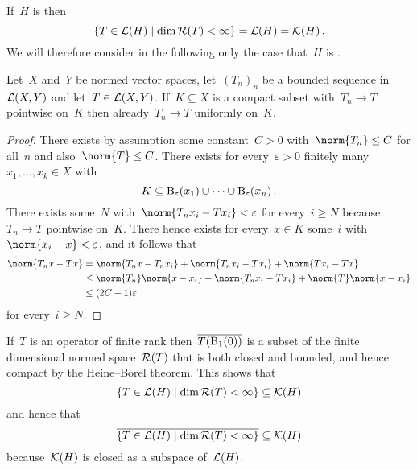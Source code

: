 \subsection{}

If~$H$ is  then
\[
  \{
    T \in \Lin(H)
  \suchthat
    \dim \Range(T) < \infty
  \}
  =
  \Lin(H)
  =
  \Compact(H) \,.
\]
We will therefore consider in the following only the case that~$H$ is .


\begin{lemma}
  \label{uniform on compact}
  Let~$X$ and~$Y$ be normed vector spaces, let~$(T_n)_n$ be a bounded sequence in~$\mathcal{L}(X,Y)$ and let~$T \in \mathcal{L}(X,Y)$.
  If~$K \subseteq X$ is a compact subset with~$T_n \to T$ pointwise on~$K$ then already~$T_n \to T$ uniformly on~$K$.
\end{lemma}


\begin{proof}
  There exists by assumption some constant~$C > 0$ with~$\norm{T_n} \leq C$ for all~$n$ and also~$\norm{T} \leq C$.
  There exists for every~$\varepsilon > 0$ finitely many~$x_1, \dotsc, x_k \in X$ with
  \[
    K
    \subseteq
    \operatorname{B}_{\varepsilon}(x_1) \cup \dotsb \cup \operatorname{B}_{\varepsilon}(x_n) \,.
  \]
  There exists some~$N$ with~$\norm{T_n x_i - T x_i} < \varepsilon$ for every~$i \geq N$ because~$T_n \to T$ pointwise on~$K$.
  There hence exists for every~$x \in K$ some~$i$ with~$\norm{x_i - x} < \varepsilon$, and it follows that
  \begin{align*}
    \norm{T_n x - T x}
    &=
      \norm{ T_n x - T_n x_i }
    + \norm{ T_n x_i - T x_i }
    + \norm{ T x_i - T x }
    \\
    &\leq
      \norm{T_n} \norm{x - x_i}
    + \norm{ T_n x_i - T x_i }
    + \norm{T} \norm{x - x_i}
    \\
    &\leq
    (2 C + 1) \varepsilon
  \end{align*}
  for every~$i \geq N$.
\end{proof}

If~$T$ is an operator of finite rank then~$\overline{T(\operatorname{B}_{1}(0))}$ is a subset of the finite dimensional normed space~$\mathcal{R}(T)$ that is both closed and bounded, and hence compact by the Heine--Borel theorem.
This shows that
\[
  \{
    T \in \Lin(H)
  \suchthat
    \dim \Range(T) < \infty
  \}
  \subseteq
  \Compact(H)
\]
and hence that
\[
  \closure{
  \{
    T \in \Lin(H)
  \suchthat
    \dim \Range(T) < \infty
  \}
  }
  \subseteq
  \Compact(H)
\]
because~$\mathcal{K}(H)$ is closed as a subspace of~$\mathcal{L}(H)$.

